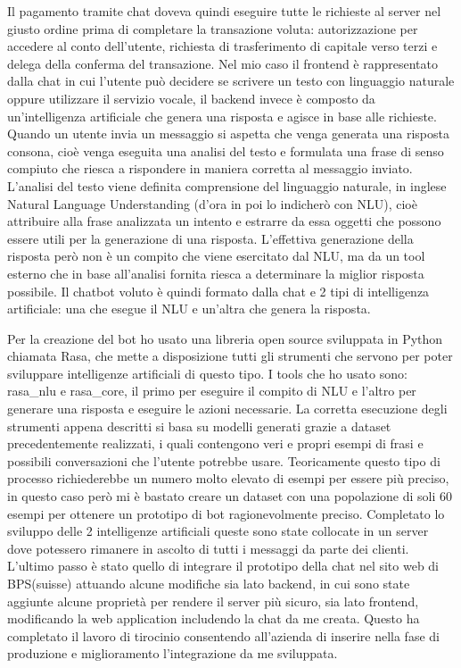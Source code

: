 Il pagamento tramite chat doveva quindi eseguire tutte le richieste al server nel giusto ordine prima di completare la transazione voluta: autorizzazione per accedere al conto dell'utente, richiesta di trasferimento di capitale verso terzi e delega della conferma del transazione.
Nel mio caso il frontend è rappresentato dalla chat in cui l'utente può decidere se scrivere un testo con linguaggio naturale oppure utilizzare il servizio vocale, il backend invece è composto da un'intelligenza artificiale che genera una risposta e agisce in base alle richieste.
Quando un utente invia un messaggio si aspetta che venga generata una risposta consona, cioè venga eseguita una analisi del testo e formulata una frase di senso compiuto che riesca a rispondere in maniera corretta al messaggio inviato.
L'analisi del testo viene definita comprensione del linguaggio naturale, in inglese Natural Language Understanding (d'ora in poi lo indicherò con NLU), cioè attribuire alla frase analizzata un intento e estrarre da essa oggetti che possono essere utili per la generazione di una risposta.
L'effettiva generazione della risposta però non è un compito che viene esercitato dal NLU, ma da un tool esterno che in base all'analisi fornita riesca a determinare la miglior risposta possibile.
Il chatbot voluto è quindi formato dalla chat e 2 tipi di intelligenza artificiale: una che esegue il NLU e un'altra che genera la risposta.
\iffalse
https://en.wikipedia.org/wiki/Natural-language_understanding
https://www.expertsystem.com/natural-language-understanding-different-nlp/
https://rasa.com/
https://rasa.com/docs/get\_started\_step1/
https://www.techopedia.com/definition/33013/natural-language-understanding-nlu
https://www.sisense.com/glossary/natural-language-understanding/
\fi
Per la creazione del bot ho usato una libreria open source sviluppata in Python chiamata Rasa, che mette a disposizione tutti gli strumenti che servono per poter sviluppare intelligenze artificiali di questo tipo. I tools che ho usato sono: rasa\_nlu e rasa\_core, il primo per eseguire il compito di NLU e l'altro per generare una risposta e eseguire le azioni necessarie.
La corretta esecuzione degli strumenti appena descritti si basa su modelli generati grazie a dataset precedentemente realizzati, i quali contengono veri e propri esempi di frasi e possibili conversazioni che l'utente potrebbe usare.
Teoricamente questo tipo di processo richiederebbe un numero molto elevato di esempi per essere più preciso, in questo caso però mi è bastato creare un dataset con una popolazione di soli 60 esempi per ottenere un prototipo di bot ragionevolmente preciso. 
Completato lo sviluppo delle 2 intelligenze artificiali queste sono state collocate in un server dove potessero rimanere in ascolto di tutti i messaggi da parte dei clienti.
L'ultimo passo è stato quello di integrare il prototipo della chat nel sito web di BPS(suisse) attuando alcune modifiche sia lato backend, in cui sono state aggiunte alcune proprietà per rendere il server più sicuro, sia lato frontend, modificando la web application includendo la chat da me creata.
Questo ha completato il lavoro di tirocinio consentendo all'azienda di inserire nella fase di produzione e miglioramento l'integrazione da me sviluppata.

